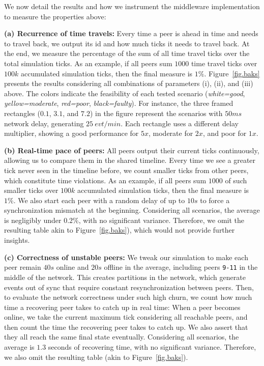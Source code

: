 \documentclass[fleqn,10pt]{SelfArx}
\newcommand{\code}[1]  {\texttt{\footnotesize{#1}}}
\begin{document}
We now detail the results and how we instrument the middleware implementation
to measure the properties above:

\textbf{(a) Recurrence of time travels:}
Every time a peer is ahead in time and needs to travel back, we output its id
and how much ticks it needs to travel back.
At the end, we measure the percentage of the sum of all time travel ticks over
the total simulation ticks.
As an example, if all peers sum $1000$ time travel ticks over $100k$
accumulated simulation ticks, then the final measure is $1\%$.
%
Figure~\ref{fig.baks} presents the results considering all combinations of
parameters (i), (ii), and (iii) above.
The colors indicate the feasibility of each tested scenario
    (\emph{white=good}, \emph{yellow=moderate}, \emph{red=poor},
    \emph{black=faulty}).
%
For instance, the three framed rectangles ($0.1$, $3.1$, and $7.2$) in the
figure represent the scenarios with $50ms$ network delay, generating
$25~evt/min$.
Each rectangle uses a different delay multiplier, showing a good performance
for $5x$, moderate for $2x$, and poor for $1x$.

\textbf{(b) Real-time pace of peers:}
All peers output their current ticks continuously, allowing us to compare them
in the shared timeline.
Every time we see a greater tick never seen in the timeline before, we count
smaller ticks from other peers, which constitute time violations.
As an example, if all peers sum $1000$ of such smaller ticks over $100k$
accumulated simulation ticks, then the final measure is $1\%$.
%
We also start each peer with a random delay of up to $10s$ to force a
synchronization mismatch at the beginning.
%
Considering all scenarios, the average is negligibly under $0.2\%$, with no
significant variance.
Therefore, we omit the resulting table akin to Figure~\ref{fig.baks}), which
would not provide further insights.

\textbf{(c) Correctness of unstable peers:}
We tweak our simulation to make each peer remain $40s$ online and $20s$
offline in the average, including peers \code{9-11} in the middle of the
network.
This creates partitions in the network, which generate events out of sync that
require constant resynchronization between peers.
%
Then, to evaluate the network correctness under such high churn, we count how
much time a recovering peer takes to catch up in real time:
When a peer becomes online, we take the current maximum tick considering all
reachable peers, and then count the time the recovering peer takes to catch up.
We also assert that they all reach the same final state eventually.
%
Considering all scenarios, the average is $1.3$ seconds of recovering time,
with no significant variance.
Therefore, we also omit the resulting table (akin to Figure~\ref{fig.baks}).
\end{document}
